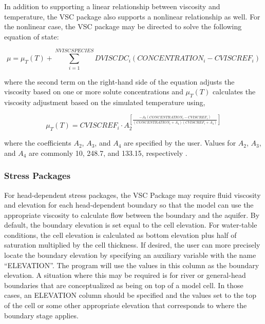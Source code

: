 In addition to supporting a linear relationship between viscosity and temperature, the VSC package also supports a nonlinear relationship as well.  For the nonlinear case, the VSC package may be directed to solve the following equation of state:

\begin{equation}
\label{eqn:viscnonlinear}
\mu = \mu_T(T) + \sum_{i=1}^{NVISCSPECIES} DVISCDC_i \left ( CONCENTRATION_i - CVISCREF_i \right )
\end{equation}

\noindent where the second term on the right-hand side of the equation adjusts the viscosity based on one or more solute concentrations and $\mu_T(T)$ calculates the viscosity adjustment based on the simulated temperature using,

\begin{equation}
\label{eqn:munonlinear}
\mu_T(T) = CVISCREF_i \cdot A_2^{\left [ \frac {-A_3 \left ( CONCENTRATION_i - CVISCREF_i \right ) } {\left ( CONCENTRATION_i + A_4 \right ) \left ( CVISCREF_i + A_4 \right )} \right ]}
\end{equation}

\noindent where the coefficients $A_2$, $A_3$, and $A_4$ are specified by the user.  Values for $A_2$, $A_3$, and $A_4$ are commonly 10, 248.7, and 133.15, respectively  \citep{langevin2008seawat, Voss1984sutra}.
 
\subsubsection{Stress Packages}
For head-dependent stress packages, the VSC Package may require fluid viscosity and elevation for each head-dependent boundary so that the model can use the appropriate viscosity to calculate flow between the boundary and the aquifer.  By default, the boundary elevation is set equal to the cell elevation.  For water-table conditions, the cell elevation is calculated as bottom elevation plus half of saturation multiplied by the cell thickness.  If desired, the user can more precisely locate the boundary elevation by specifying an auxiliary variable with the name ``ELEVATION''.  The program will use the values in this column as the boundary elevation.  A situation where this may be required is for river or general-head boundaries that are conceptualized as being on top of a model cell.  In those cases, an ELEVATION column should be specified and the values set to the top of the cell or some other appropriate elevation that corresponds to where the boundary stage applies.

